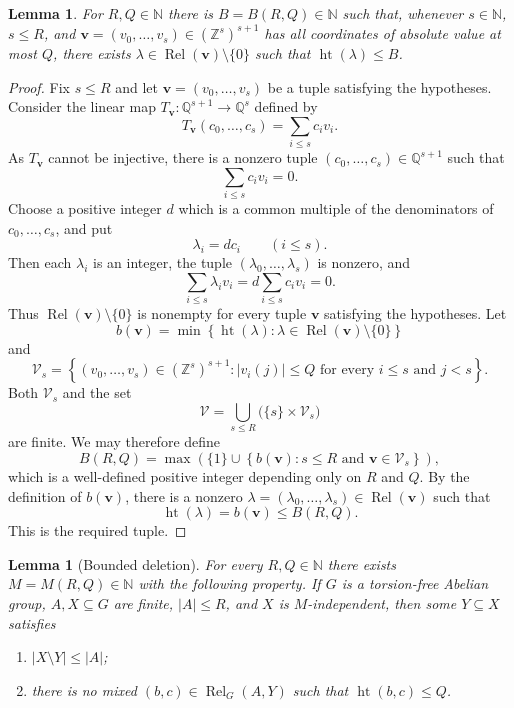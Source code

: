 \documentclass[10pt,a4paper]{amsart}
\newtheorem{lemma}[theorem]{Lemma}
\newcommand{\N}{\mathbb N}
\newcommand{\Z}{\mathbb Z}
\newcommand{\Q}{\mathbb Q}
\newcommand{\Rel}{\operatorname{Rel}}
\newcommand{\htop}{\operatorname{ht}}
\begin{document}
\begin{lemma}\label{lem:integer-dependence}
For $R,Q\in\N$ there is $B=B(R,Q)\in\N$ such that, whenever
$s\in\N$, $s\leq R$, and
$\mathbf v=(v_0,\ldots,v_s)\in(\Z^s)^{s+1}$ has all coordinates of
absolute value at most $Q$, there exists
$\lambda\in\Rel(\mathbf v)\setminus\{0\}$ such that
$\htop(\lambda)\leq B$.
\end{lemma}
\begin{proof}
Fix $s\leq R$ and let $\mathbf v=(v_0,\ldots,v_s)$ be a tuple satisfying
the hypotheses.  Consider the linear map
$T_{\mathbf v}:\Q^{s+1}\longrightarrow\Q^s$
defined by
\[
T_{\mathbf v}(c_0,\ldots,c_s)
   =\sum_{i\le s}c_i v_i.
\]
As $T_{\mathbf v}$ cannot be injective, there
is a nonzero tuple $(c_0,\ldots,c_s)\in\Q^{s+1}$
such that
\[
\sum_{i\le s}c_i v_i=0.
\]
Choose a positive integer $d$ which is a common multiple of the
denominators of $c_0,\ldots,c_s$, and put
\[
\lambda_i=dc_i
\qquad(i\le s).
\]
Then each $\lambda_i$ is an integer, the tuple
$(\lambda_0,\ldots,\lambda_s)$ is nonzero, and
\[
\sum_{i\le s}\lambda_i v_i
   =d\sum_{i\le s}c_i v_i
   =0.
\]
Thus $\Rel(\mathbf v)\setminus\{0\}$ is nonempty for every tuple
$\mathbf v$ satisfying the hypotheses.  Let
\[
b(\mathbf v)=
\min\left\{
 \htop(\lambda):
 \lambda\in\Rel(\mathbf v)\setminus\{0\}
\right\}
\]
and
\[
\mathcal V_s=
\left\{
 (v_0,\ldots,v_s)\in(\Z^s)^{s+1}:
 |v_i(j)|\le Q
 \text{ for every }i\le s\text{ and }j<s
\right\}.
\]
Both $\mathcal V_s$ and the set
\[
\mathcal V=
\bigcup_{s\le R}\bigl(\{s\}\times\mathcal V_s\bigr)
\]
are finite.  We may therefore define
\[
B(R,Q)=
\max\left(
 \{1\}\cup
 \left\{
 b(\mathbf v):
 s\le R\text{ and }\mathbf v\in\mathcal V_s
 \right\}
\right),
\]
which is a well-defined positive integer depending only on $R$ and
$Q$.
By the definition of
$b(\mathbf v)$, there is a nonzero
$\lambda=(\lambda_0,\ldots,\lambda_s)\in
\Rel(\mathbf v)$ such that
\[
\htop(\lambda)=b(\mathbf v)\le B(R,Q).
\]
This is the required tuple.
\end{proof}

\begin{lemma}[Bounded deletion]\label{lem:bounded-deletion}
For every $R,Q\in\N$ there exists $M=M(R,Q)\in\N$ with the following
property.  If $G$ is a torsion-free Abelian group, $A,X\subseteq G$ are
finite, $|A|\leq R$, and $X$ is
$M$-independent, then some $Y\subseteq X$ satisfies
\begin{enumerate}
\item $|X\setminus Y|\leq|A|$;
\item there is no mixed $(b,c)\in\Rel_G(A,Y)$ such that
$\htop(b,c)\leq Q$.
\end{enumerate}
\end{lemma}
\end{document}
